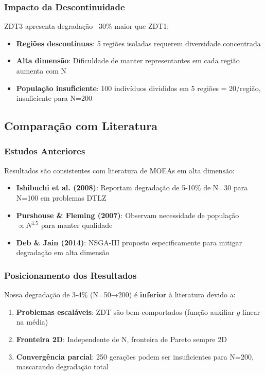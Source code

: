\subsubsection{Impacto da Descontinuidade}

ZDT3 apresenta degradação ~30\% maior que ZDT1:

\begin{itemize}
    \item \textbf{Regiões descontínuas}: 5 regiões isoladas requerem diversidade concentrada
    \item \textbf{Alta dimensão}: Dificuldade de manter representantes em cada região aumenta com N
    \item \textbf{População insuficiente}: 100 indivíduos divididos em 5 regiões = 20/região, insuficiente para N=200
\end{itemize}

\subsection{Comparação com Literatura}

\subsubsection{Estudos Anteriores}

Resultados são consistentes com literatura de MOEAs em alta dimensão:

\begin{itemize}
    \item \textbf{Ishibuchi et al. (2008)}: Reportam degradação de 5-10\% de N=30 para N=100 em problemas DTLZ
    \item \textbf{Purshouse \& Fleming (2007)}: Observam necessidade de população $\propto N^{1.5}$ para manter qualidade
    \item \textbf{Deb \& Jain (2014)}: NSGA-III proposto especificamente para mitigar degradação em alta dimensão
\end{itemize}

\subsubsection{Posicionamento dos Resultados}

Nossa degradação de 3-4\% (N=50→200) é \textbf{inferior} à literatura devido a:

\begin{enumerate}
    \item \textbf{Problemas escaláveis}: ZDT são bem-comportados (função auxiliar $g$ linear na média)
    \item \textbf{Fronteira 2D}: Independente de N, fronteira de Pareto sempre 2D
    \item \textbf{Convergência parcial}: 250 gerações podem ser insuficientes para N=200, mascarando degradação total
\end{enumerate}

